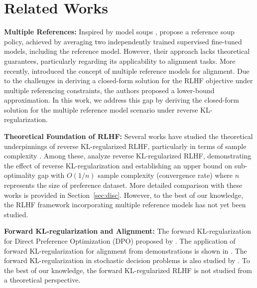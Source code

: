 \section{Related Works}
\textbf{Multiple References:} Inspired by model soups \citep{wortsman2022model}, \citet{chegini2024salsa} propose a reference soup policy, achieved by averaging two independently trained supervised fine-tuned models, including the reference model. However, their approach lacks theoretical guarantees, particularly regarding its applicability to alignment tasks. More recently, \citet{le2024multi} introduced the concept of multiple reference models for alignment. Due to the challenges in deriving a closed-form solution for the RLHF objective under multiple referencing constraints, the authors proposed a lower-bound approximation. In this work, we address this gap by deriving the closed-form solution for the multiple reference model scenario under reverse KL-regularization.

\textbf{Theoretical Foundation of RLHF:} Several works have studied the theoretical underpinnings of reverse KL-regularized RLHF, particularly in terms of sample complexity \citep{zhao2024sharp,xiong2024iterative,song2024importance,zhan2023provable,ye2024theoretical}. Among these, \citet{zhao2024sharp} analyze reverse KL-regularized RLHF, demonstrating the effect of reverse KL-regularization and establishing an upper bound on sub-optimality gap with $O(1/n)$ sample complexity (convergence rate)  where $n$ represents the size of preference dataset. More detailed comparison with these works is provided in Section~\ref{sec:disc}. However, to the best of our knowledge, the RLHF framework incorporating multiple reference models has not yet been studied. 

\textbf{Forward KL-regularization and Alignment:} The forward KL-regularization for Direct Preference Optimization (DPO) proposed by \citet{wangbeyond}. The application of forward KL-regularization for alignment from demonstrations is shown in \citep{sun2024inverse}. The forward KL-regularization in stochastic decision problems is also studied by \citet{cohen2017data}. To the best of our knowledge, the forward KL-regularized RLHF is not studied from a theoretical perspective.